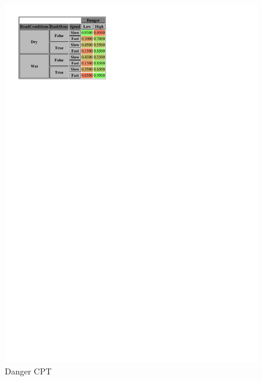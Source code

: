 \documentclass[a4paper,12pt]{article} %
\begin{document}
\begin{figure}[H]
\begin{center}
\begin{minipage}[c]{.45\textwidth}
		\includegraphics[width=\linewidth]{../code/danger.pdf}	
		\caption*{Danger CPT}
		\label{fig:danger}
	\end{minipage}


\end{center}
\end{figure}
\end{document}
